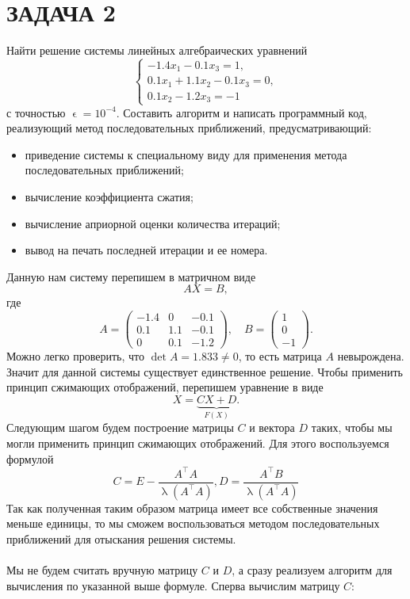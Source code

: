 \documentclass[a4paper, 12pt]{report}
\renewcommand{\lambda}{\uplambda}
\renewcommand{\epsilon}{\upvarepsilon}
\begin{document}
	\section*{ЗАДАЧА 2}
	Найти решение системы линейных алгебраических уравнений $$\begin{cases}
	-1.4x_1 - 0.1x_3 = 1,\\
	0.1x_1 + 1.1x_2 - 0.1x_3 = 0,\\
	0.1x_2 - 1.2x_3 = -1
	\end{cases}$$ с точностью $\epsilon=10^{-4}$. Составить алгоритм и написать программный код, реализующий метод последовательных приближений, предусматривающий:
	\begin{itemize}
		\item приведение системы к специальному виду для применения метода последовательных приближений;
		\item вычисление коэффициента сжатия;
		\item вычисление априорной оценки количества итераций;
		\item вывод на печать последней итерации и ее номера.
	\end{itemize}
	Данную нам систему перепишем в матричном виде $$AX = B,$$ где $$A = \begin{pmatrix}
	-1.4 & 0 & -0.1\\
	0.1 & 1.1 & -0.1\\
	0 & 0.1 & -1.2
	\end{pmatrix},\quad B = \begin{pmatrix}
	1 \\ 0 \\ -1
	\end{pmatrix}.$$
	Можно легко проверить, что $\det A = 1.833 \ne 0$, то есть матрица $A$ невырождена. Значит для данной системы существует единственное решение. Чтобы применить принцип сжимающих отображений, перепишем уравнение в виде $$X = \underbrace{CX + D}_{F(X)}.$$
	Следующим шагом будем построение матрицы $C$ и вектора $D$ таких, чтобы мы могли применить принцип сжимающих отображений. Для этого воспользуемся формулой $$
	C=E-\frac{A^{\top} A}{\lambda\left(A^{\top} A\right)}, D=\frac{A^{\top} B}{\lambda\left(A^{\top} A\right)}
	$$
	Так как полученная таким образом матрица имеет все собственные значения меньше единицы, то мы сможем воспользоваться методом последовательных приближений для отыскания решения системы.\\\\
	Мы не будем считать вручную матрицу $C$ и $D$, а сразу реализуем алгоритм для вычисления по указанной выше формуле. Сперва вычислим матрицу $C$:
\end{document}
